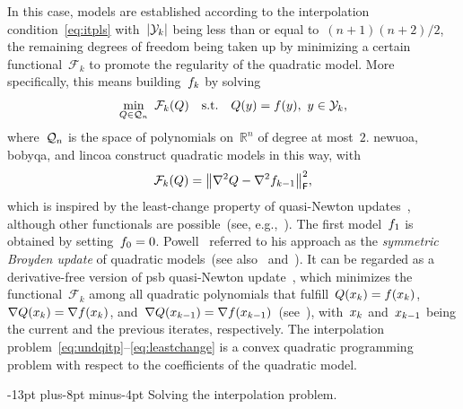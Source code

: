 \documentclass[
    smallextended,  %
    final,          %
]{svjour3}
\makeatletter
\newcommand{\abs}[2][]{#1\lvert#2#1\rvert}
\newcommand{\norm}[2][]{#1\lVert#2#1\rVert}
\newcommand{\R}{\mathbb{R}}
\newcommand{\st}{\text{s.t.}}
\newcommand{\frob}{\mathsf{F}}
\newcommand{\func}{\mathcal{F}}
\newcommand{\iter}[1][k]{x\ifthenelse{\equal{#1}{}}{}{_{#1}}}
\newcommand{\objm}[1][k]{\obj\ifthenelse{\equal{#1}{}}{}{_{#1}}}
\newcommand{\obj}{f}
\newcommand{\qspace}[1][n]{\mathcal{Q}\ifthenelse{\equal{#1}{}}{}{_{#1}}}
\newcommand{\xpt}[1][k]{\mathcal{Y}\ifthenelse{\equal{#1}{}}{}{_{#1}}}
\def\paragraph{\@startsection{paragraph}{4}{\z@}%
    {-13pt plus-8pt minus-4pt}{\z@}
    {\normalsize\bfseries}}
\newcommand{\modified}[1]{\texorpdfstring{{\color{RoyalBlue}#1}}{#1}}
\makeatother
\begin{document}
In this case, models are established according to the interpolation condition~\eqref{eq:itpls} with~$\abs{\xpt}$ being less than \modified{or equal to}~$(n + 1)(n + 2) / 2$, the remaining degrees of freedom being taken up by minimizing a certain functional~$\func_k$ to promote the regularity of the quadratic model.
More specifically, this means building~$\objm$ by solving
\begin{equation}
    \label{eq:undqitp}
        \min_{Q \in \qspace} ~ \func_k(Q) \quad \st \quad Q(y) = \obj(y), ~ y \in \xpt,
\end{equation}
where~$\qspace$ is the space of polynomials on~$\R^n$ of degree at most~$2$.
\Gls{newuoa}, \gls{bobyqa}, and \gls{lincoa} construct quadratic models in this way, with
\begin{equation}
    \label{eq:leastchange}
    \func_k(Q) = \norm[\big]{\nabla^2 Q - \nabla^2 \objm[k - 1]}_{\frob}^2,
\end{equation}
which is inspired by the least-change property of quasi-Newton updates~\cite{Dennis_Schnabel_1979}, although other functionals are possible~(see\modified{, e.g.,}~\cite{Conn_Toint_1996,Bandeira_Scheinberg_Vicente_2012,Powell_2013,Zhang_2014,Xie_Yuan_2023}).
The first model~$\objm[1]$ is obtained by setting~$\objm[0] = 0$.
Powell~\cite{Powell_2013} referred to his approach as the \emph{symmetric Broyden update} of quadratic models~(see also~\cite[\S~3.6]{Zhang_2012} and~\cite[\S~2.4.2]{Ragonneau_2022}).
It can be regarded as a derivative-free version of \gls{psb} quasi-Newton update~\cite{Powell_1970b}, which minimizes the functional~$\func_k$ among all quadratic polynomials that fulfill~$Q(\iter) = \obj(\iter)$, $\nabla Q(\iter) = \nabla \obj(\iter)$, and~$\nabla Q(\iter[k - 1]) = \nabla \obj(\iter[k - 1])$~(see~\cite[Theorem~4.2]{Dennis_Schnabel_1979}), with~$\iter$ and~$\iter[k - 1]$ being the current and the previous iterates, respectively.
The interpolation problem~\eqref{eq:undqitp}--\eqref{eq:leastchange} is a convex quadratic programming problem with respect to the coefficients of the quadratic model.

\paragraph{Solving the interpolation problem.}
\end{document}
